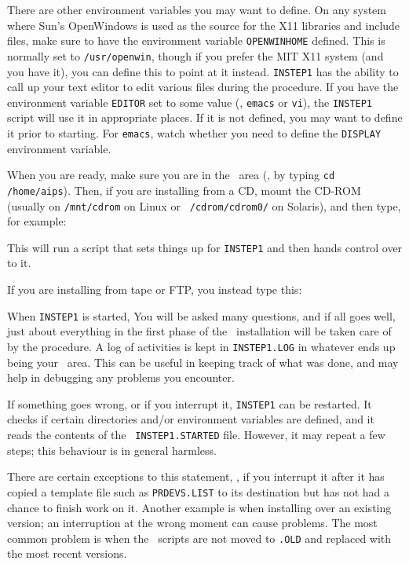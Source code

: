 There are other environment variables you may want to define.  On any
system where Sun's OpenWindows is used as the source for the X11
libraries and include files, make sure to have the environment variable
{\tt OPENWINHOME} defined.  This is normally set to {\tt /usr/openwin},
though if you prefer the MIT X11 system (and you have it), you can
define this to point at it instead.  {\tt INSTEP1} has the ability to
call up your text editor to edit various files during the procedure.  If
you have the environment variable {\tt EDITOR} set to some value (\eg,
{\tt emacs} or {\tt vi}), the {\tt INSTEP1} script will use it in
appropriate places.  If it is not defined, you may want to define it
prior to starting.  For {\tt emacs}, watch whether you need to define
the {\tt DISPLAY} environment variable.

When you are ready, make sure you are in the \AROOT\ area (\eg, by
typing {\tt cd /home/aips}).  Then, if you are installing from a CD,
mount the CD-ROM (usually on {\tt /mnt/cdrom} on Linux or {\tt
/cdrom/cdrom0/} on Solaris), and then type, for example:\medskip

\medskip

\noindent This will run a script that sets things up for {\tt INSTEP1}
and then hands control over to it.

If you are installing from tape or FTP, you instead type this:\medskip

\medskip

When {\tt INSTEP1} is started, You will be asked many questions, and if
all goes well, just about everything in the first phase of the
\AIPS\ installation will be taken care of by the procedure.  A log of
activities is kept in {\tt INSTEP1.LOG} in whatever ends up being your
\AROOT\ area.  This can be useful in keeping track of what was
done, and may help in debugging any problems you encounter.

If something goes wrong, or if you interrupt it, {\tt INSTEP1} can be
restarted.  It checks if certain directories and/or environment
variables are defined, and it reads the contents of the {\tt
INSTEP1.STARTED} file.  However, it may repeat a few steps; this
behaviour is in general harmless.

There are certain exceptions to this statement, \eg, if you interrupt it
after it has copied a template file such as {\tt PRDEVS.LIST} to its
destination but has not had a chance to finish work on it.  Another
example is when installing over an existing version; an interruption at
the wrong moment can cause problems.  The most common problem is when
the \AROOT\ scripts are not moved to {\tt *.OLD} and replaced with the
most recent versions.

